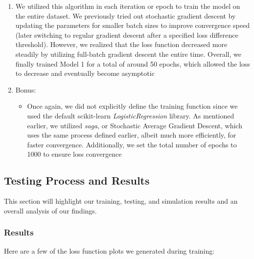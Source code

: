 \documentclass[11pt]{article}
\begin{document}
\begin{enumerate}
    \item We utilized this algorithm in each iteration or epoch to train the model on the entire dataset. We previously tried out stochastic gradient descent by updating the parameters for smaller batch sizes to improve convergence speed (later switching to regular gradient descent after a specified loss difference threshold). However, we realized that the loss function decreased more steadily by utilizing full-batch gradient descent the entire time. Overall, we finally trained Model 1 for a total of around 50 epochs, which allowed the loss to decrease and eventually become asymptotic
    \item Bonus:
    \begin{itemize}
        \item Once again, we did not explicitly define the training function since we used the default scikit-learn \emph{LogisticRegression} library. As mentioned earlier, we utilized \emph{saga}, or Stochastic Average Gradient Descent, which uses the same process defined earlier, albeit much more efficiently, for faster convergence. Additionally, we set the total number of epochs to 1000 to ensure loss convergence
    \end{itemize}
\end{enumerate}

\subsection{Testing Process and Results}

This section will highlight our training, testing, and simulation results and an overall analysis of our findings.

\subsubsection{Results}

Here are a few of the loss function plots we generated during training:
\end{document}

